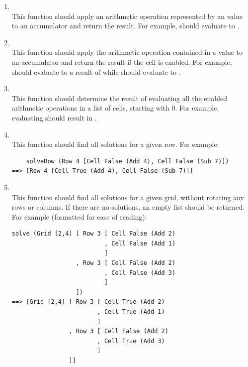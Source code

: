 \begin{enumerate}
	\item {}\\
	This function should apply an arithmetic operation represented by an  value to an accumulator and return the result. For example,  should evaluate to .
	
	\item {}\\
	This function should apply the arithmetic operation contained in a  value to an accumulator and return the result if the cell is enabled. For example,  should evaluate to a result of  while \linebreak {} should evaluate to .
	
	\item {}\\
	This function should determine the result of evaluating all the enabled arithmetic operations in a list of cells, starting with $0$. For example, evaluating  should result in .
	
	\item {}\\
	This function should find all solutions for a given row. For example:
\begin{verbatim}
    solveRow (Row 4 [Cell False (Add 4), Cell False (Sub 7)])
==> [Row 4 [Cell True (Add 4), Cell False (Sub 7)]]
\end{verbatim}
	
	\item {}\\
	This function should find all solutions for a given grid, without rotating any rows or columns. If there are no solutions, an empty list should be returned. For example (formatted for ease of reading):
\begin{verbatim}
solve (Grid [2,4] [ Row 3 [ Cell False (Add 2)
                          , Cell False (Add 1)
                          ]
                  , Row 3 [ Cell False (Add 2)
                          , Cell False (Add 3)
                          ]
                  ])
==> [Grid [2,4] [ Row 3 [ Cell True (Add 2)
                        , Cell True (Add 1)
                        ]
                , Row 3 [ Cell False (Add 2)
                        , Cell True (Add 3)
                        ]
                ]]
\end{verbatim}
	

\end{enumerate}
